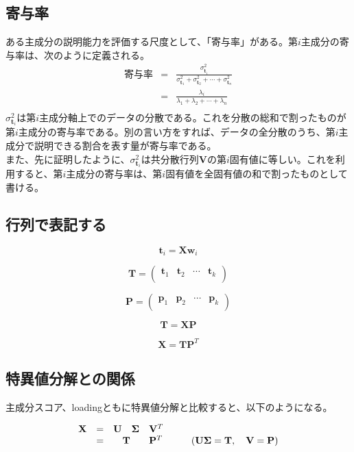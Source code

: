 \subsection{寄与率}
ある主成分の説明能力を評価する尺度として、「寄与率」がある。第\(i\)主成分の寄与率は、次のように定義される。\\
\begin{eqnarray*}
\mbox{寄与率} & = &  \frac{\sigma^2_{\mathbf t_i}}{\sigma^2_{\mathbf t_1} + \sigma^2_{\mathbf t_2} + \cdots + \sigma^2_{\mathbf t_n}} \\
             & = & \frac{\lambda_i}{\lambda_1 + \lambda_2 + \cdots + \lambda_n} \\
\end{eqnarray*}
\(\sigma^2_{\mathbf t_i}\)は第\(i\)主成分軸上でのデータの分散である。これを分散の総和で割ったものが第\(i\)主成分の寄与率である。別の言い方をすれば、データの全分散のうち、第\(i\)主成分で説明できる割合を表す量が寄与率である。\\
\indent また、先に証明したように、\(\sigma^2_{\mathbf t_i}\)は共分散行列\({\mathbf V}\)の第\(i\)固有値に等しい。これを利用すると、第\(i\)主成分の寄与率は、第\(i\)固有値を全固有値の和で割ったものとして書ける。
\subsection{行列で表記する}
\[{\mathbf t}_i = {\mathbf X}{\mathbf w}_i\]

\[
{\mathbf T} 
= 
\left( 
\begin{array}{cccc}
{\mathbf t}_1 & {\mathbf t}_2 & \cdots & {\mathbf t}_k \\
\end{array}
\right)
\]

\[
{\mathbf P} 
= 
\left( 
\begin{array}{cccc}
{\mathbf p}_1 & {\mathbf p}_2 & \cdots & {\mathbf p}_k \\
\end{array}
\right)
\]

\[ {\mathbf T} = {\mathbf X} {\mathbf P}  \]

\[ {\mathbf X} = {\mathbf T} {\mathbf P}^T  \]

\subsection{特異値分解との関係}

\indent 主成分スコア、loadingともに特異値分解と比較すると、以下のようになる。

\[
\begin{array}{ccccl}
{\mathbf X} & = & {\mathbf U} & {\mathbf \Sigma} & {\mathbf V}^T\\
            & = & \multicolumn{2}{c}{\bf T} &{\mathbf P}^T \hspace{3em}({\mathbf U}{\mathbf \Sigma} = {\mathbf T}, \hspace{1em}{\mathbf V}={\mathbf P})\\
\end{array}
\]

